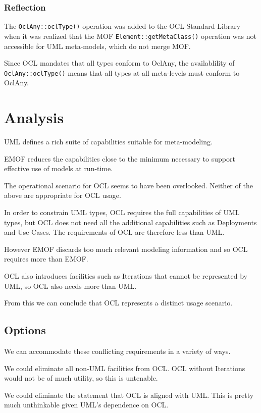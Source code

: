 \documentclass{eceasst}
\begin{document}
\subsubsection{Reflection}

The \verb|OclAny::oclType()| operation was added to the OCL Standard Library when it was realized that the MOF \verb|Element::getMetaClass()| operation was not accessible for UML meta-models, which do not merge MOF.

Since OCL mandates that all types conform to OclAny, the availablility of \verb|OclAny::oclType()| means that all types at all meta-levels must conform to OclAny.   

\section{Analysis}

UML defines a rich suite of capabilities suitable for meta-modeling.

EMOF reduces the capabilities close to the minimum necessary to support effective use of models at run-time.

The operational scenario for OCL seems to have been overlooked. Neither of the above are appropriate for OCL usage.

In order to constrain UML types, OCL requires the full capabilities of UML types, but OCL does not need all the additional capabilities such as Deployments and Use Cases. The requirements of OCL are therefore less than UML.

However EMOF discards too much relevant modeling information and so OCL requires more than EMOF.

OCL also introduces facilities such as Iterations that cannot be represented by UML, so OCL also needs more than UML.

From this we can conclude that OCL represents a distinct usage scenario.

\subsection{Options}

We can accommodate these conflicting requirements in a variety of ways.

We could eliminate all non-UML facilities from OCL. OCL without Iterations would not be of much utility, so this is untenable.

We could eliminate the statement that OCL is aligned with UML. This is pretty much unthinkable given UML's dependence on OCL.
\end{document}
